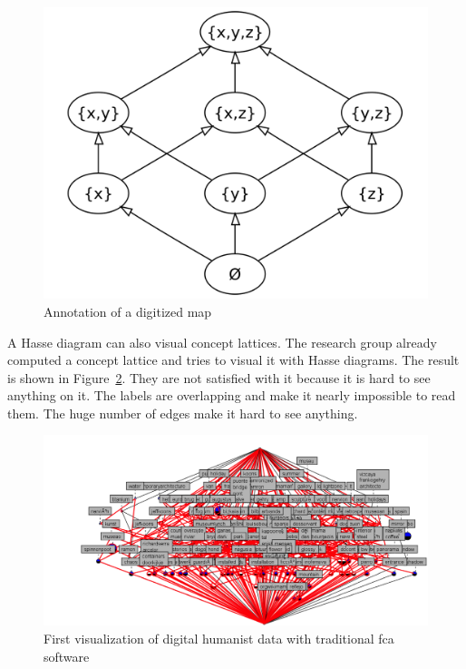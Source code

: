 \documentclass[11pt]{report}
\begin{document}
\begin{figure}[!ht]
	\centering
	\includegraphics[width=\linewidth]{./images/hasse}
\caption{Annotation of a digitized map}
\label{figure:hasse}
\end{figure}

A Hasse diagram can also visual concept lattices. The research group already computed a concept lattice and tries to visual it with Hasse diagrams. The result is shown in Figure~\ref{figure:firstVisualizaion}. They are not satisfied  with it because it is hard to see anything on it. The labels are overlapping and make it nearly impossible to read them. The huge number of edges make it hard to see anything.  \\

\begin{figure}[!ht]
	\centering
	\includegraphics[width=\linewidth]{./images/firstVisualization}
\caption{First visualization of digital humanist data with traditional \acrshort{fca} software}
\label{figure:firstVisualizaion}
\end{figure}
\end{document}
